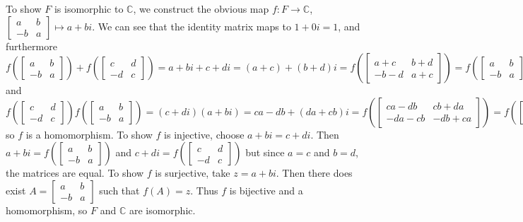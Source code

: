 \documentclass{amsart}
\begin{document}
	To show $F$ is isomorphic to $\mathbb{C}$, we construct the obvious map $f: F \to \mathbb{C}$, $\begin{bmatrix}
	a & b \\
	-b & a
	\end{bmatrix} \mapsto a+bi$. We can see that the identity matrix maps to $1 + 0i = 1$, and furthermore
	$$f(\begin{bmatrix}
	a & b \\
	-b & a
	\end{bmatrix}) + f(
	\begin{bmatrix}
	c & d \\
	-d & c
	\end{bmatrix}) = a+bi + c+di = (a+c) + (b+d)i = f(\begin{bmatrix}
	a+c & b+d \\
	-b-d & a+c
	\end{bmatrix}) = f(\begin{bmatrix}
	a & b \\
	-b & a
	\end{bmatrix} +
	\begin{bmatrix}
	c & d \\
	-d & c
	\end{bmatrix}) $$
	and
	$$f(\begin{bmatrix}
	c & d \\
	-d & c
	\end{bmatrix}) f(
	\begin{bmatrix}
	a & b \\
	-b & a
	\end{bmatrix}) = (c+di)(a+bi) = ca-db + (da+cb)i = f(\begin{bmatrix}
	ca-db & cb+da \\
	-da-cb & -db+ca
	\end{bmatrix}) = f(\begin{bmatrix}
		c & d \\
		-d & c
	\end{bmatrix} 
	\begin{bmatrix}
		a & b \\
		-b & a
	\end{bmatrix})$$
	so $f$ is a homomorphism. To show $f$ is injective, choose $a+bi = c+di$. Then 
	$a+bi = f(\begin{bmatrix}
	a & b \\
	-b & a
	\end{bmatrix})$ and $c+di = f(\begin{bmatrix}
	c & d \\
	-d & c
	\end{bmatrix})$ but since $a=c$ and $b=d$, the matrices are equal. To show $f$ is surjective, take $z=a+bi$. Then there does exist $A =\begin{bmatrix}
	a & b \\
	-b & a
	\end{bmatrix}$ such that $f(A) = z$. Thus $f$ is bijective and a homomorphism, so $F$ and $\mathbb{C}$ are isomorphic.
	
\end{document}
